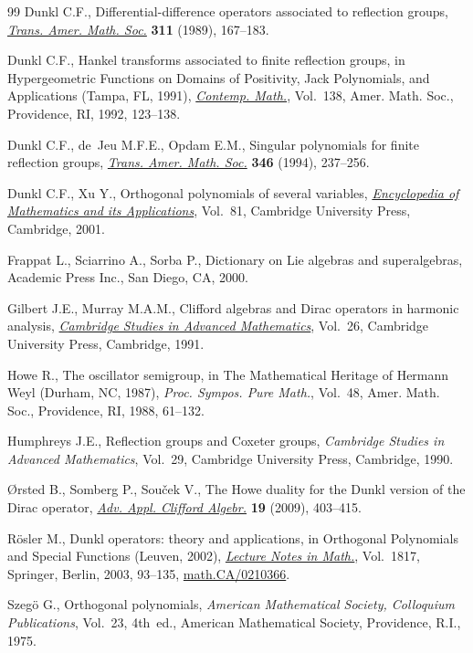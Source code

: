 \documentclass[11pt]{article}
\numberwithin{equation}{section}
\numberwithin{theorem}{section}
\numberwithin{proposition}{section}
\numberwithin{lemma}{section}
\numberwithin{corollary}{section}
\numberwithin{definition}{section}
\numberwithin{example}{section}
\numberwithin{remark}{section}
\numberwithin{note}{section}
\theoremstyle{remark}
\begin{document}
\begin{thebibliography}{99}
Dunkl C.F., Dif\/ferential-dif\/ference operators associated to ref\/lection groups,
\href{http://dx.doi.org/10.2307/2001022}{\textit{Trans.
Amer.
Math.
Soc.}} \textbf{311} (1989), 167--183.

Dunkl C.F., Hankel transforms associated to f\/inite ref\/lection groups, in
Hypergeometric Functions on Domains of Positivity, {J}ack Polynomials, and
Applications ({T}ampa, {FL}, 1991),
\href{http://dx.doi.org/10.1090/conm/138/1199124}{\textit{Contemp.
Math.}}, Vol.~138, Amer.
Math.
Soc., Providence, RI, 1992, 123--138.

Dunkl C.F., de~Jeu M.F.E., Opdam E.M., Singular polynomials for f\/inite
ref\/lection groups, \href{http://dx.doi.org/10.2307/2154950}{\textit{Trans.
Amer.
Math.
Soc.}} \textbf{346} (1994),
237--256.

Dunkl C.F., Xu Y., Orthogonal polynomials of several variables,
\href{http://dx.doi.org/10.1017/CBO9780511565717}{\textit{Encyclopedia of Mathematics and its
Applications}}, Vol.~81, Cambridge
University Press, Cambridge, 2001.

Frappat L., Sciarrino A., Sorba P., Dictionary on {L}ie algebras and
superalgebras, Academic Press Inc., San Diego, CA, 2000.

Gilbert J.E., Murray M.A.M., Clif\/ford algebras and {D}irac operators in
harmonic analysis, \href{http://dx.doi.org/10.1017/CBO9780511611582}{\textit{Cambridge Studies in
Advanced Mathematics}},
Vol.~26, Cambridge University Press, Cambridge, 1991.

Howe R., The oscillator semigroup, in The Mathematical Heritage of {H}ermann
{W}eyl ({D}urham, {NC}, 1987), \textit{Proc.
Sympos.
Pure Math.}, Vol.~48,
Amer.
Math.
Soc., Providence, RI, 1988, 61--132.

Humphreys J.E., Ref\/lection groups and {C}oxeter groups, \textit{Cambridge
Studies in Advanced Mathematics}, Vol.~29, Cambridge University Press,
Cambridge, 1990.

{\O}rsted B., Somberg P., Sou{\v{c}}ek V., The {H}owe duality for the {D}unkl
version of the {D}irac operator, \href{http://dx.doi.org/10.1007/s00006-009-0166-3}{\textit{Adv.
Appl.
Clif\/ford Algebr.}}
\textbf{19} (2009), 403--415.

R{\"o}sler M., Dunkl operators: theory and applications, in Orthogonal
Polynomials and Special Functions ({L}euven, 2002),
\href{http://dx.doi.org/10.1007/3-540-44945-0_3}{\textit{Lecture Notes in
Math.}}, Vol.~1817, Springer, Berlin, 2003, 93--135,
\href{http://arxiv.org/abs/math.CA/0210366}{math.CA/0210366}.

Szeg{\"{o}} G., Orthogonal polynomials, \textit{American Mathematical Society,
Colloquium Publications}, Vol.~23, 4th~ed., American Mathematical Society,
Providence, R.I., 1975.

\end{thebibliography}
\end{document}
